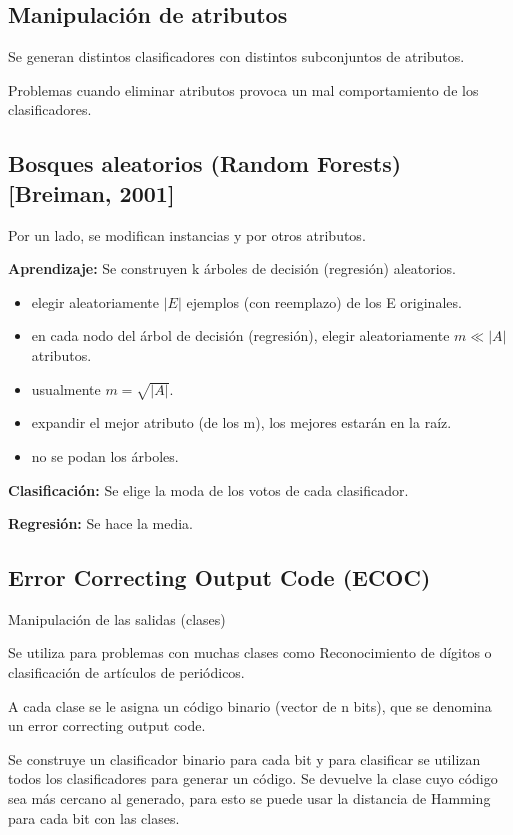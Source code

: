 \documentclass[12pt, twoside, openright]{report} %
\begin{document}
\subsection{Manipulación de atributos}
Se generan distintos clasificadores con distintos subconjuntos de atributos.

Problemas cuando eliminar atributos provoca un mal comportamiento de los clasificadores.

\subsection{Bosques aleatorios (Random Forests) [Breiman, 2001]}
Por un lado, se modifican instancias y por otros atributos.

\textbf{Aprendizaje:} Se construyen k árboles de decisión (regresión) aleatorios.
\begin{itemize}
	\item elegir aleatoriamente $|E|$ ejemplos (con reemplazo) de los E originales.
	\item en cada nodo del árbol de decisión (regresión), elegir aleatoriamente $m \ll |A|$ atributos.
	\item usualmente $m = \sqrt{|A|}$.
	\item expandir el mejor atributo (de los m), los mejores estarán en la raíz.
	\item no se podan los árboles.
\end{itemize}

\textbf{Clasificación:} Se elige la moda de los votos de cada clasificador.

\textbf{Regresión:} Se hace la media.

\subsection{Error Correcting Output Code (ECOC)}
Manipulación de las salidas (clases)

Se utiliza para problemas con muchas clases como Reconocimiento de dígitos o clasificación de artículos de periódicos.

A cada clase se le asigna un código binario (vector de n bits), que se denomina un error correcting output code.

Se construye un clasificador binario para cada bit y para clasificar se utilizan todos los clasificadores para generar un código. Se devuelve la clase cuyo código sea más cercano al generado, para esto se puede usar la distancia de Hamming para cada bit con las clases.
\end{document}
